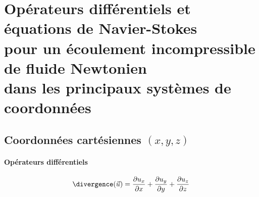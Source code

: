 \section{Opérateurs différentiels et équations de Navier-Stokes \\ pour un écoulement incompressible de fluide Newtonien \\dans les principaux systèmes de coordonnées}











\subsection{Coordonn\'ees cart\'esiennes $(x,y,z)$}


\paragraph{Opérateurs différentiels}
$$
\divergence (\vec{u}) = \dpa{u_x}{x} + \dpa{u_y}{y} + \dpa{u_z}{z}
$$


